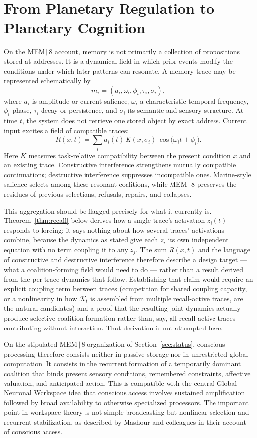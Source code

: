 \documentclass[11pt]{article}
\begin{document}
\section{From Planetary Regulation to Planetary Cognition}

On the MEM\,$|$\,8 account, memory is not primarily a collection of propositions stored at addresses. It is a dynamical field in which prior events modify the conditions under which later patterns can resonate. A memory trace may be represented schematically by
\[
m_i = (a_i, \omega_i, \phi_i, \tau_i, \sigma_i),
\]
where $a_i$ is amplitude or current salience, $\omega_i$ a characteristic temporal frequency, $\phi_i$ phase, $\tau_i$ decay or persistence, and $\sigma_i$ its semantic and sensory structure. At time $t$, the system does not retrieve one stored object by exact address. Current input excites a field of compatible traces:
\[
R(x,t) = \sum_i a_i(t)\, K(x,\sigma_i)\, \cos\bigl(\omega_i t + \phi_i\bigr).
\]
Here $K$ measures task-relative compatibility between the present condition $x$ and an existing trace. Constructive interference strengthens mutually compatible continuations; destructive interference suppresses incompatible ones. Marine-style salience selects among these resonant coalitions, while MEM\,$|$\,8 preserves the residues of previous selections, refusals, repairs, and collapses.

This aggregation should be flagged precisely for what it currently is. Theorem~\ref{thm:recall} below derives how a single trace's activation $z_i(t)$ responds to forcing; it says nothing about how several traces' activations combine, because the dynamics as stated give each $z_i$ its own independent equation with no term coupling it to any $z_j$. The sum $R(x,t)$ and the language of constructive and destructive interference therefore describe a design target --- what a coalition-forming field would need to do --- rather than a result derived from the per-trace dynamics that follow. Establishing that claim would require an explicit coupling term between traces (competition for shared coupling capacity, or a nonlinearity in how $\mathcal{K}_t$ is assembled from multiple recall-active traces, are the natural candidates) and a proof that the resulting joint dynamics actually produce selective coalition formation rather than, say, all recall-active traces contributing without interaction. That derivation is not attempted here.

On the stipulated MEM\,$|$\,8 organization of Section~\ref{sec:status}, conscious processing therefore consists neither in passive storage nor in unrestricted global computation. It consists in the recurrent formation of a temporarily dominant coalition that binds present sensory conditions, remembered constraints, affective valuation, and anticipated action. This is compatible with the central Global Neuronal Workspace idea that conscious access involves sustained amplification followed by broad availability to otherwise specialized processors. The important point in workspace theory is not simple broadcasting but nonlinear selection and recurrent stabilization, as described by Mashour and colleagues in their account of conscious access.
\end{document}

